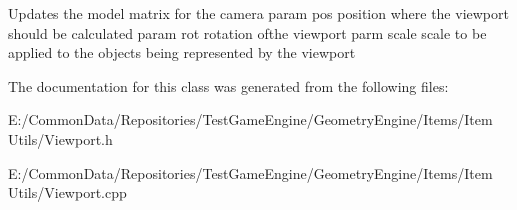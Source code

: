 Updates the model matrix for the camera param pos position where the viewport should be calculated param rot rotation ofthe viewport parm scale scale to be applied to the objects being represented by the viewport 

The documentation for this class was generated from the following files\+:\begin{DoxyCompactItemize}
\item 
E\+:/\+Common\+Data/\+Repositories/\+Test\+Game\+Engine/\+Geometry\+Engine/\+Items/\+Item Utils/Viewport.\+h\item 
E\+:/\+Common\+Data/\+Repositories/\+Test\+Game\+Engine/\+Geometry\+Engine/\+Items/\+Item Utils/Viewport.\+cpp\end{DoxyCompactItemize}
